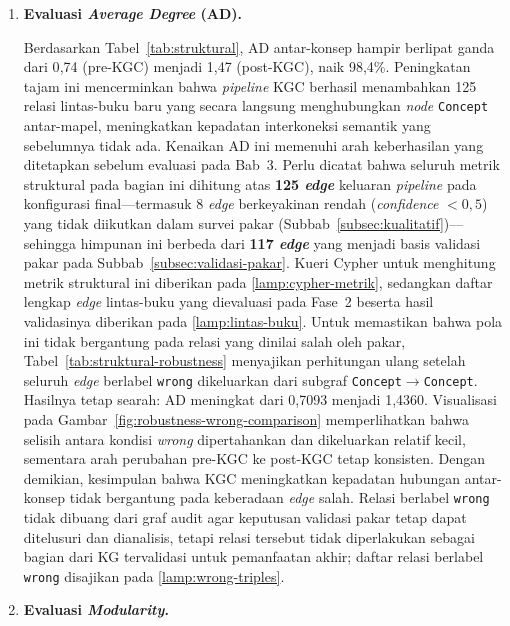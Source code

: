 \documentclass[../../thesis]{subfiles}
\begin{document}
\begin{enumerate}
  \item \textbf{Evaluasi \textit{Average Degree} (AD).}

  Berdasarkan Tabel~\ref{tab:struktural}, AD antar-konsep hampir berlipat ganda
  dari 0{,}74 (pre-KGC) menjadi 1{,}47 (post-KGC), naik 98{,}4\%. Peningkatan
  tajam ini mencerminkan bahwa \textit{pipeline} KGC berhasil menambahkan 125
  relasi lintas-buku baru yang secara langsung menghubungkan \textit{node}
  \texttt{Concept} antar-mapel, meningkatkan kepadatan interkoneksi semantik
  yang sebelumnya tidak ada. Kenaikan AD ini memenuhi arah keberhasilan
  yang ditetapkan sebelum evaluasi pada Bab~3. Perlu dicatat bahwa seluruh metrik
  struktural pada
  bagian ini dihitung atas \textbf{125 \textit{edge}} keluaran \textit{pipeline}
  pada konfigurasi final---termasuk 8 \textit{edge} berkeyakinan rendah
  (\textit{confidence} $< 0{,}5$) yang tidak diikutkan dalam survei pakar
  (Subbab~\ref{subsec:kualitatif})---sehingga himpunan ini berbeda dari
  \textbf{117 \textit{edge}} yang menjadi basis validasi pakar pada
  Subbab~\ref{subsec:validasi-pakar}.
  Kueri Cypher untuk menghitung metrik struktural ini diberikan pada
  \ref{lamp:cypher-metrik}, sedangkan daftar lengkap \textit{edge}
  lintas-buku yang dievaluasi pada Fase~2 beserta hasil validasinya diberikan
  pada \ref{lamp:lintas-buku}.
  Untuk memastikan bahwa pola ini tidak bergantung pada relasi yang dinilai salah
  oleh pakar, Tabel~\ref{tab:struktural-robustness} menyajikan perhitungan ulang
  setelah seluruh \textit{edge} berlabel \texttt{wrong} dikeluarkan dari subgraf
  \texttt{Concept}$\rightarrow$\texttt{Concept}. Hasilnya tetap searah: AD
  meningkat dari 0{,}7093 menjadi 1{,}4360. Visualisasi pada
  Gambar~\ref{fig:robustness-wrong-comparison} memperlihatkan bahwa selisih
  antara kondisi \textit{wrong} dipertahankan dan dikeluarkan relatif kecil,
  sementara arah perubahan pre-KGC ke post-KGC tetap konsisten. Dengan demikian,
  kesimpulan bahwa KGC meningkatkan kepadatan hubungan antar-konsep tidak
  bergantung pada keberadaan \textit{edge} salah. Relasi berlabel
  \texttt{wrong} tidak dibuang dari graf audit agar keputusan validasi pakar
  tetap dapat ditelusuri dan dianalisis, tetapi relasi tersebut tidak
  diperlakukan sebagai bagian dari KG tervalidasi untuk pemanfaatan akhir;
  daftar relasi berlabel \texttt{wrong} disajikan pada \ref{lamp:wrong-triples}.

  \item \textbf{Evaluasi \textit{Modularity}.}


\end{enumerate}
\end{document}
